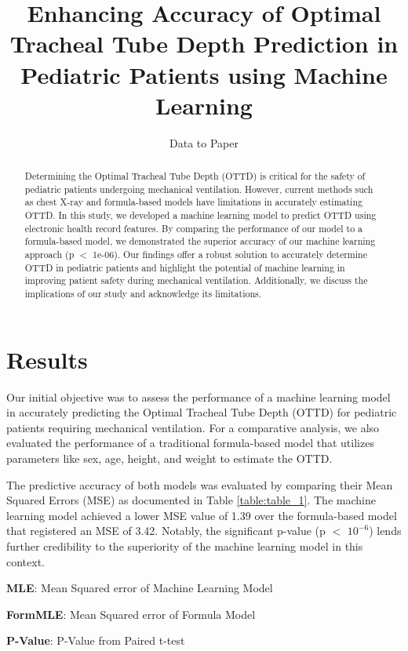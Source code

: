 \documentclass[11pt]{article}
\title{Enhancing Accuracy of Optimal Tracheal Tube Depth Prediction in Pediatric Patients using Machine Learning}
\author{Data to Paper}
\begin{document}
\maketitle
\begin{abstract}
Determining the Optimal Tracheal Tube Depth (OTTD) is critical for the safety of pediatric patients undergoing mechanical ventilation. However, current methods such as chest X-ray and formula-based models have limitations in accurately estimating OTTD. In this study, we developed a machine learning model to predict OTTD using electronic health record features. By comparing the performance of our model to a formula-based model, we demonstrated the superior accuracy of our machine learning approach (p $<$ 1e-06). Our findings offer a robust solution to accurately determine OTTD in pediatric patients and highlight the potential of machine learning in improving patient safety during mechanical ventilation. Additionally, we discuss the implications of our study and acknowledge its limitations.
\end{abstract}
\section*{Results}

Our initial objective was to assess the performance of a machine learning model in accurately predicting the Optimal Tracheal Tube Depth (OTTD) for pediatric patients requiring mechanical ventilation. For a comparative analysis, we also evaluated the performance of a traditional formula-based model that utilizes parameters like sex, age, height, and weight to estimate the OTTD.

The predictive accuracy of both models was evaluated by comparing their Mean Squared Errors (MSE) as documented in Table \ref{table:table_1}. The machine learning model achieved a lower MSE value of 1.39 over the formula-based model that registered an MSE of 3.42. Notably, the significant p-value (p $<$ $10^{-6}$) lends further credibility to the superiority of the machine learning model in this context.

\begin{table}[h]
\caption{Mean squared errors of ML model and formula-based model, and p-value from paired t-test}
\label{table:table_1}
\begin{threeparttable}
\renewcommand{\TPTminimum}{\linewidth}
\begin{tablenotes}
\footnotesize
\item \textbf{MLE}: Mean Squared error of Machine Learning Model
\item \textbf{FormMLE}: Mean Squared error of Formula Model
\item \textbf{P-Value}: P-Value from Paired t-test
\end{tablenotes}
\end{threeparttable}
\end{table}
\end{document}
